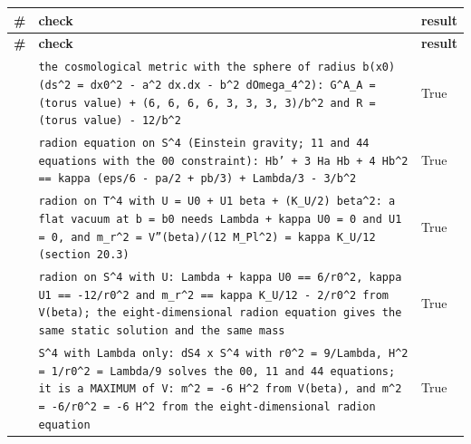 \documentclass[10pt,a4paper]{article}
\begin{document}
{\footnotesize
\begin{longtable}{>{\raggedright\arraybackslash}p{}>{\raggedright\arraybackslash}p{}>{\raggedright\arraybackslash}p{}}
\toprule
\textbf{\#} & \textbf{check} & \textbf{result} \\
\midrule\endfirsthead
\toprule
\textbf{\#} & \textbf{check} & \textbf{result} \\
\midrule\endhead
\endfoot
\bottomrule\endlastfoot
453 & \texttt{the cosmological metric with the sphere of radius b(x0) (ds\textasciicircum{}2 = dx0\textasciicircum{}2 - a\textasciicircum{}2 dx.dx - b\textasciicircum{}2 dOmega\_\allowbreak{}4\textasciicircum{}2): G\textasciicircum{}A\_\allowbreak{}A = (torus value) + (6, 6, 6, 6, 3, 3, 3, 3)/\allowbreak{}b\textasciicircum{}2 and R = (torus value) - 12/\allowbreak{}b\textasciicircum{}2} & True \\
454 & \texttt{radion equation on S\textasciicircum{}4 (Einstein gravity; 11 and 44 equations with the 00 constraint): Hb' + 3 Ha Hb + 4 Hb\textasciicircum{}2 == kappa (eps/\allowbreak{}6 - pa/\allowbreak{}2 + pb/\allowbreak{}3) + Lambda/\allowbreak{}3 - 3/\allowbreak{}b\textasciicircum{}2} & True \\
455 & \texttt{radion on T\textasciicircum{}4 with U = U0 + U1 beta + (K\_\allowbreak{}U/\allowbreak{}2) beta\textasciicircum{}2: a flat vacuum at b = b0 needs Lambda + kappa U0 = 0 and U1 = 0, and m\_\allowbreak{}r\textasciicircum{}2 = V''(beta)/\allowbreak{}(12 M\_\allowbreak{}Pl\textasciicircum{}2) = kappa K\_\allowbreak{}U/\allowbreak{}12 (section 20.3)} & True \\
456 & \texttt{radion on S\textasciicircum{}4 with U: Lambda + kappa U0 == 6/\allowbreak{}r0\textasciicircum{}2, kappa U1 == -12/\allowbreak{}r0\textasciicircum{}2 and m\_\allowbreak{}r\textasciicircum{}2 == kappa K\_\allowbreak{}U/\allowbreak{}12 - 2/\allowbreak{}r0\textasciicircum{}2 from V(beta); the eight-dimensional radion equation gives the same static solution and the same mass} & True \\
457 & \texttt{S\textasciicircum{}4 with Lambda only: dS4 x S\textasciicircum{}4 with r0\textasciicircum{}2 = 9/\allowbreak{}Lambda, H\textasciicircum{}2 = 1/\allowbreak{}r0\textasciicircum{}2 = Lambda/\allowbreak{}9 solves the 00, 11 and 44 equations; it is a MAXIMUM of V: m\textasciicircum{}2 = -6 H\textasciicircum{}2 from V(beta), and m\textasciicircum{}2 = -6/\allowbreak{}r0\textasciicircum{}2 = -6 H\textasciicircum{}2 from the eight-dimensional radion equation} & True \\

\end{longtable}}
\end{document}
